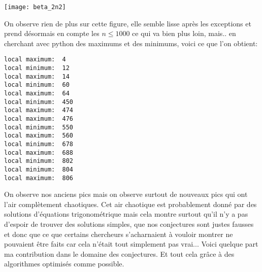 \texttt{[image: beta\_2n2]}

On observe rien de plus sur cette figure, elle semble lisse après les exceptions et prend désormais en compte les $n \leq 1000$ ce qui va bien plus loin, mais.. en cherchant avec python des maximums et des minimums, voici ce que l'on obtient:

\begin{verbatim}
local maximum:  4
local minimum:  12
local maximum:  14
local minimum:  60
local maximum:  64
local minimum:  450
local maximum:  474
local maximum:  476
local minimum:  550
local maximum:  560
local minimum:  678
local maximum:  688
local minimum:  802
local minimum:  804
local maximum:  806
\end{verbatim}

On observe nos anciens pics mais on observe surtout de nouveaux pics qui ont l'air complètement chaotiques. Cet air chaotique est probablement donné par des solutions d'équations trigonométrique mais cela montre surtout qu'il n'y a pas d'espoir de trouver des solutions simples, que nos conjectures sont justes fausses et donc que ce que certains chercheurs s'acharnaient à vouloir montrer ne pouvaient être faits car cela n'était tout simplement pas vrai... Voici quelque part ma contribution dans le domaine des conjectures. Et tout cela grâce à des algorithmes optimisés comme possible.